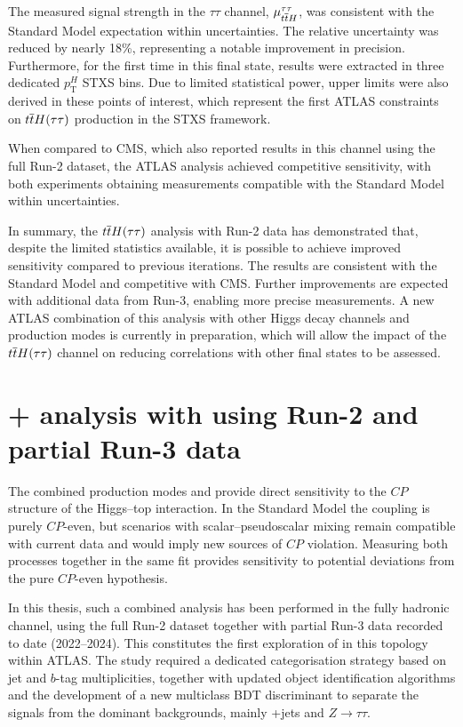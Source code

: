 The measured signal strength in the \(\tau\tau\) channel, \(\mu_{t\overline{t}H}^{\tau\tau}\), was consistent with the Standard Model expectation within uncertainties. The relative uncertainty was reduced by nearly 18\%, representing a notable improvement in precision. Furthermore, for the first time in this final state, results were extracted in three dedicated \(p_{\mathrm{T}}^{H}\) STXS bins. Due to limited statistical power, upper limits were also derived in these points of interest, which represent the first ATLAS constraints on \(t\overline{t}H(\tau\tau)\) production in the STXS framework.  

When compared to CMS, which also reported results in this channel using the full Run-2 dataset, the ATLAS analysis achieved competitive sensitivity, with both experiments obtaining measurements compatible with the Standard Model within uncertainties.  

In summary, the \(t\overline{t}H(\tau\tau)\) analysis with Run-2 data has demonstrated that, despite the limited statistics available, it is possible to achieve improved sensitivity compared to previous iterations. The results are consistent with the Standard Model and competitive with CMS. Further improvements are expected with additional data from Run-3, enabling more precise measurements. A new ATLAS combination of this analysis with other Higgs decay channels and production modes is currently in preparation, which will allow the impact of the \(t\overline{t}H(\tau\tau)\) channel on reducing correlations with other final states to be assessed.  

\section{\thqb + \ttH analysis with \htautau using Run-2 and partial Run-3 data}

The combined production modes \ttH and \thqb provide direct sensitivity to the $CP$ structure of the Higgs–top interaction. In the Standard Model the coupling is purely $CP$-even, but scenarios with scalar–pseudoscalar mixing remain compatible with current data and would imply new sources of $CP$ violation. Measuring both processes together in the same fit provides sensitivity to potential deviations from the pure $CP$-even hypothesis.  

In this thesis, such a combined analysis has been performed in the fully hadronic \htautau channel, using the full Run-2 dataset together with partial Run-3 data recorded to date (2022–2024). This constitutes the first exploration of \thqb in this topology within ATLAS. The study required a dedicated categorisation strategy based on jet and $b$-tag multiplicities, together with updated object identification algorithms and the development of a new multiclass BDT discriminant to separate the signals from the dominant backgrounds, mainly \ttbar+jets and $Z\to\tau\tau$.  


